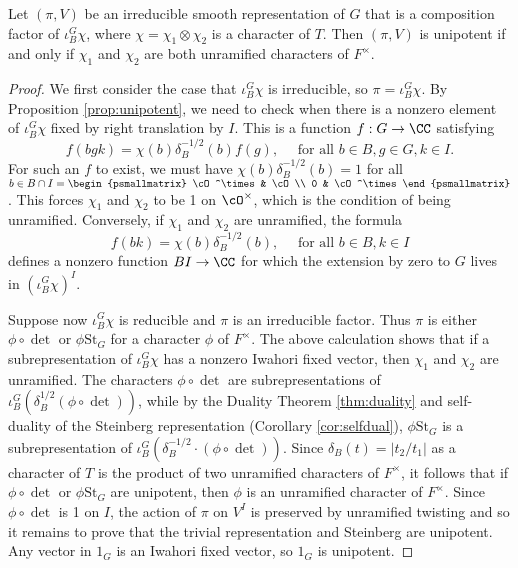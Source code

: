 \begin{prop}\label{prop:unipotent2}
    Let $(\pi,V)$ be an irreducible smooth representation of $G$ that is a composition factor of $\iota_B^G\chi$, where $\chi=\chi_1\otimes \chi_2$ is a character of $T$. Then $(\pi,V)$ is unipotent if and only if $\chi_1$ and $\chi_2$ are both unramified characters of $F^\times$.
\end{prop}
\begin{proof}
    We first consider the case that $\iota_B^G\chi$ is irreducible, so $\pi = \iota_B^G\chi$. By Proposition \ref{prop:unipotent}, we need to check when there is a nonzero element of $\iota_B^G\chi$ fixed by right translation by $I$. This is a function $f: G \to \CC$ satisfying 
    $$f(bgk) = \chi(b)\delta_B^{-1/2}(b)f(g), \hspace{1em}\text{ for all } b \in B, g \in G, k \in I.$$
    For such an $f$ to exist, we must have $\chi(b)\delta_B^{-1/2}(b)=1$ for all $b \in B \cap I = \begin{psmallmatrix}
        \cO^\times & \cO \\ 0 & \cO^\times
    \end{psmallmatrix}$. This forces $\chi_1$ and $\chi_2$ to be 1 on $\cO^\times$, which is the condition of being unramified. Conversely, if $\chi_1$ and $\chi_2$ are unramified, the formula
    $$f(bk) = \chi(b)\delta_B^{-1/2}(b), \hspace{1em}\text{ for all } b \in B, k \in I$$
    defines a nonzero function $BI \to \CC$ for which the extension by zero to $G$ lives in $(\iota_B^G \chi)^I$.


    Suppose now $\iota_B^G \chi$ is reducible and $\pi$ is an irreducible factor. Thus $\pi$ is either $\phi \circ \det$ or $\phi \mathrm{St}_G$ for a character $\phi$ of $F^\times$. The above calculation shows that if a subrepresentation of $\iota_B^G \chi$ has a nonzero Iwahori fixed vector, then $\chi_1$ and $\chi_2$ are unramified. The characters $\phi \circ \det$ are subrepresentations of $\iota_B^G(\delta_B^{1/2}(\phi\circ \det))$, while by the Duality Theorem \ref{thm:duality} and self-duality of the Steinberg representation (Corollary \ref{cor:selfdual}), $\phi\mathrm{St}_G$ is a subrepresentation of $\iota_B^G(\delta_B^{-1/2}\cdot(\phi\circ \det))$. Since $\delta_B(t)=|t_2/t_1|$ as a character of $T$ is the product of two unramified characters of $F^\times$, it follows that if $\phi \circ \det$ or $\phi \mathrm{St}_G$ are unipotent, then $\phi$ is an unramified character of $F^\times$. Since $\phi \circ \det$ is 1 on $I$, the action of $\pi$ on $V^{I}$ is preserved by unramified twisting and so it remains to prove that the trivial representation and Steinberg are unipotent. Any vector in $1_G$ is an Iwahori fixed vector, so $1_G$ is unipotent. 
    

\end{proof}
